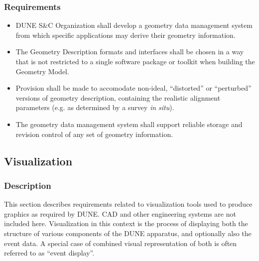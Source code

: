 \subsubsection{Requirements}
\begin{itemize}
	\item DUNE S\&C Organization shall develop a  geometry data management system from which specific applications may derive their geometry information.
	
	\item The Geometry Description formats and interfaces shall be chosen in a way that is not restricted to a single 
	software package or toolkit when building the Geometry Model.
	
	\item Provision shall be made to accomodate non-ideal, ``distorted'' or ``perturbed'' versions of geometry description, 
	containing the realistic alignment parameters (e.g. as determined by a survey \textit{in situ}).
	
	\item The geometry data management system shall support reliable storage and  revision control of any set of geometry information.
	
\end{itemize}

\subsection{Visualization}
\subsubsection{Description}

This section describes requirements related to visualization tools used to produce graphics as required by DUNE. CAD and other engineering systems are not included here. Visualization in this context is the process of displaying both the structure of various components of the DUNE apparatus, and optionally also the event data. A special case of combined visual representation of both is often referred to as ``event display''.

